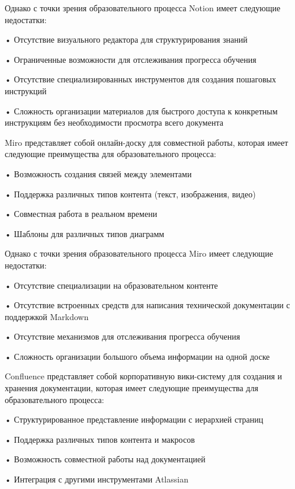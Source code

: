 {  \par \redline Однако с точки зрения образовательного процесса Notion имеет следующие недостатки:
  
  \par \redline • Отсутствие визуального редактора для структурирования знаний
  \par \redline • Ограниченные возможности для отслеживания прогресса обучения
  \par \redline • Отсутствие специализированных инструментов для создания пошаговых инструкций
  \par \redline • Сложность организации материалов для быстрого доступа к конкретным инструкциям без необходимости просмотра всего документа

  \par \redline Miro представляет собой онлайн-доску для совместной работы, которая имеет следующие преимущества для образовательного процесса:
  
  \par \redline • Возможность создания связей между элементами
  \par \redline • Поддержка различных типов контента (текст, изображения, видео)
  \par \redline • Совместная работа в реальном времени
  \par \redline • Шаблоны для различных типов диаграмм
  
  \par \redline Однако с точки зрения образовательного процесса Miro имеет следующие недостатки:
  
  \par \redline • Отсутствие специализации на образовательном контенте
  \par \redline • Отсутствие встроенных средств для написания технической документации с поддержкой Mark\-down
  \par \redline • Отсутствие механизмов для отслеживания прогресса обучения
  \par \redline • Сложность организации большого объема информации на одной доске

  \par \redline Confluence представляет собой корпоративную вики-систему для создания и хранения документации, которая имеет следующие преимущества для образовательного процесса:
  
  \par \redline • Структурированное представление информации с иерархией страниц
  \par \redline • Поддержка различных типов контента и макросов
  \par \redline • Возможность совместной работы над документацией
  \par \redline • Интеграция с другими инструментами Atlassian
  
}
